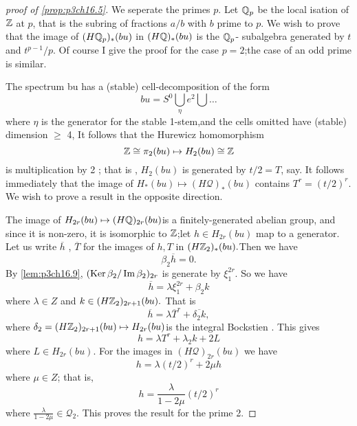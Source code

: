 \documentclass[../main]{subfiles}
\begin{document}
\begin{proof}[proof of \ref{prop:p3ch16.5}] We seperate the primes $p$. Let $\mathbb{Q}_p$ be the local isation of $\mathbb{Z}$ at $p$, that is the subring of fractions $a/b$ with $b$ prime to $p$. We wish to prove that the image of $(H\mathbb{Q}_{p})_{\ast}(bu)$ in $(H\mathbb{Q})_{\ast}(bu)$ is the $\mathbb{Q}_{p}$- subalgebra generated by $t$ and $t^{p-1}/p$. Of course I give the proof for the case $p=2$;the case of an odd prime is similar.

The spectrum bu has a (stable) cell-decomposition of the form \begin{equation*}
    bu=S^{0}\bigcup_{\eta}e^{2}\bigcup\dots
\end{equation*}
where $\eta$ is the generator for the stable 1-stem,and the cells omitted have (stable) dimension $\geq$ 4, It follows that the Hurewicz homomorphism \begin{equation*}
    \mathbb{Z} \cong \pi_{2}(bu) \mapsto H_{2}(bu) \cong \mathbb{Z}
\end{equation*}
is multiplication by 2 ; that is , $H_{2}(bu)$ is generated by $t/2=T$, say. It follows immediately that the image of $H_{\ast}(bu) \mapsto (H\mathcal{Q})_{\ast}(bu)$ contains $T^{r}=(t/2)^{r}.$ We wish to prove a result in the opposite direction.

The image of $H_{2r}(bu)\mapsto (H\mathbb{Q})_{2r}(bu)$is a finitely-generated abelian group, and since it is non-zero, it is isomorphic to $\mathbb{Z}$;let $h\in H_{2r}(bu) $ map to a generator. Let us write $\overline{h}$ , $\overline{T}$ for the images of $h,T$ in $(H\mathbb{Z}_2)_{\ast}(bu).$Then we have \begin{equation*}
    \beta_{2}\overline{h}=0 .
\end{equation*}
By \ref{lem:p3ch16.9}, $(\mathop{\mathrm{Ker}}\beta_{2}/\mathop{\mathrm{Im}}\beta_{2})_{2r}$ is generate by $\xi_{1}^{2r}$. So we have \begin{equation*}
    \overline{h}= \lambda \xi_{1}^{2r}+\beta_{2}k
\end{equation*}
where $\lambda \in Z$ and $k\in (H\mathbb{Z}_2)_{2r+1}(bu).$ That is \begin{equation*}
    \overline{h}= \lambda\overline{T}^{r}+\overline{\delta_{2}k},
\end{equation*}
where  $\delta_{2}=(H\mathbb{Z}_2)_{2r+1}(bu)\mapsto H_{2r}(bu)$is the integral Bockstien . This gives \begin{equation*}
    h=\lambda T^{r}+\lambda_{2}k+2L 
\end{equation*}
where $L\in H_{2r}(bu).$ For the images in $(H\mathcal{Q})_{2r}(bu)$ we have \begin{equation*}
    h=\lambda(t/2)^{r}+2\mu h
\end{equation*}
where $\mu \in Z$; that is, \begin{equation*}
    h=\frac{\lambda}{1-2\mu}(t/2)^{r}
\end{equation*}
where $\frac{\lambda}{1-2\mu}\in \mathcal{Q}_{2}$. This proves the result for the prime 2. 
\end{proof}
\end{document}

